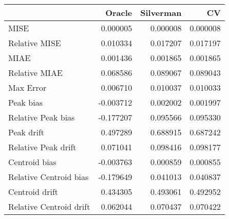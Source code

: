 \begin{tabular}{lrrr}
  \hline
 & Oracle & Silverman & CV \\ 
  \hline
MISE & 0.000005 & 0.000008 & 0.000008 \\ 
  Relative MISE & 0.010334 & 0.017207 & 0.017197 \\ 
  MIAE & 0.001436 & 0.001865 & 0.001865 \\ 
  Relative MIAE & 0.068586 & 0.089067 & 0.089043 \\ 
  Max Error & 0.006710 & 0.010037 & 0.010033 \\ 
  Peak bias & -0.003712 & 0.002002 & 0.001997 \\ 
  Relative Peak bias & -0.177207 & 0.095566 & 0.095330 \\ 
  Peak drift & 0.497289 & 0.688915 & 0.687242 \\ 
  Relative Peak drift & 0.071041 & 0.098416 & 0.098177 \\ 
  Centroid bias & -0.003763 & 0.000859 & 0.000855 \\ 
  Relative Centroid bias & -0.179649 & 0.041013 & 0.040837 \\ 
  Centroid drift & 0.434305 & 0.493061 & 0.492952 \\ 
  Relative Centroid drift & 0.062044 & 0.070437 & 0.070422 \\ 
   \hline
\end{tabular}

